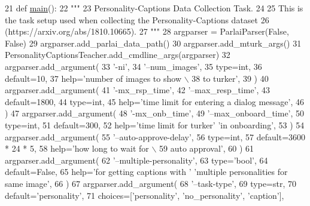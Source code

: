 \begin{DoxyCode}
21 \textcolor{keyword}{def }\hyperlink{namespaceprojects_1_1wizard__of__wikipedia_1_1mturk__evaluation__task_1_1run_ad3ab2c71f8083c3112815c0b363d316b}{main}():
22     \textcolor{stringliteral}{"""}
23 \textcolor{stringliteral}{    Personality-Captions Data Collection Task.}
24 \textcolor{stringliteral}{}
25 \textcolor{stringliteral}{    This is the task setup used when collecting the Personality-Captions dataset}
26 \textcolor{stringliteral}{    (https://arxiv.org/abs/1810.10665).}
27 \textcolor{stringliteral}{    """}
28     argparser = ParlaiParser(\textcolor{keyword}{False}, \textcolor{keyword}{False})
29     argparser.add\_parlai\_data\_path()
30     argparser.add\_mturk\_args()
31     PersonalityCaptionsTeacher.add\_cmdline\_args(argparser)
32     argparser.add\_argument(
33         \textcolor{stringliteral}{'-ni'},
34         \textcolor{stringliteral}{'--num\_images'},
35         type=int,
36         default=10,
37         help=\textcolor{stringliteral}{'number of images to show \(\backslash\)}
38 \textcolor{stringliteral}{                           to turker'},
39     )
40     argparser.add\_argument(
41         \textcolor{stringliteral}{'-mx\_rsp\_time'},
42         \textcolor{stringliteral}{'--max\_resp\_time'},
43         default=1800,
44         type=int,
45         help=\textcolor{stringliteral}{'time limit for entering a dialog message'},
46     )
47     argparser.add\_argument(
48         \textcolor{stringliteral}{'-mx\_onb\_time'},
49         \textcolor{stringliteral}{'--max\_onboard\_time'},
50         type=int,
51         default=300,
52         help=\textcolor{stringliteral}{'time limit for turker'} \textcolor{stringliteral}{'in onboarding'},
53     )
54     argparser.add\_argument(
55         \textcolor{stringliteral}{'--auto-approve-delay'},
56         type=int,
57         default=3600 * 24 * 5,
58         help=\textcolor{stringliteral}{'how long to wait for  \(\backslash\)}
59 \textcolor{stringliteral}{                           auto approval'},
60     )
61     argparser.add\_argument(
62         \textcolor{stringliteral}{'--multiple-personality'},
63         type=\textcolor{stringliteral}{'bool'},
64         default=\textcolor{keyword}{False},
65         help=\textcolor{stringliteral}{'for getting captions with '} \textcolor{stringliteral}{'multiple personalities for same image'},
66     )
67     argparser.add\_argument(
68         \textcolor{stringliteral}{'--task-type'},
69         type=str,
70         default=\textcolor{stringliteral}{'personality'},
71         choices=[\textcolor{stringliteral}{'personality'}, \textcolor{stringliteral}{'no\_personality'}, \textcolor{stringliteral}{'caption'}],

\end{DoxyCode}
